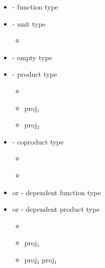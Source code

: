 \begin{itemize}
  \item{   - function type}
  \item{ - unit type}
  \begin{itemize}
    \item{ \AgdaSymbol{:} }
  \end{itemize}
  \item{ - empty type}
  \item{   - product type}
  \begin{itemize}
    \item{\AgdaInductiveConstructor{\_,\_} \AgdaSymbol{:}       }
    \item{\AgdaFunction
{proj₁} \AgdaSymbol{:}     }
    \item{\AgdaFunction
{proj₂} \AgdaSymbol{:}     }
  \end{itemize}
  \item{   - coproduct type}
  \begin{itemize}
    \item{ \AgdaSymbol{:}     }
    \item{ \AgdaSymbol{:}     }
  \end{itemize} 
  \item{  or \AgdaSymbol{(} \AgdaSymbol{:} \AgdaSymbol{)}   - dependent function type}
  \item{  or \AgdaFunction{Σ[}    \AgdaFunction{]}  - dependent product type}
  \begin{itemize}
    \item{\AgdaInductiveConstructor{\_,\_} \AgdaSymbol{:} \AgdaSymbol{(} \AgdaSymbol{:} \AgdaSymbol{)}     }
    \item{\AgdaFunction
{proj₁} \AgdaSymbol{:}    }
    \item{\AgdaFunction
{proj₂} \AgdaSymbol{:} \AgdaSymbol{(} \AgdaSymbol{:}  \AgdaSymbol{)}   \AgdaSymbol{(}\AgdaFunction
{proj₁} \AgdaSymbol{)}}
  \end{itemize}
\end{itemize}

